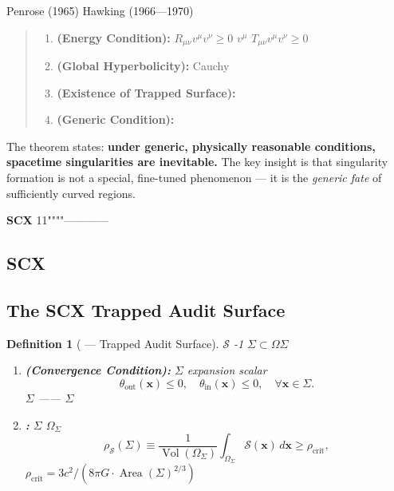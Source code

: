 \documentclass[12pt,a4paper]{article}
\newtheorem{definition}[theorem]{Definition}
\theoremstyle{remark}
\newcommand{\x}{\mathbf{x}}
\DeclareMathOperator{\Vol}{Vol}
\DeclareMathOperator{\Area}{Area}
\newcommand{\cG}{G}          %
\newcommand{\cC}{c}          %
\begin{document}
\noindent
\textbf{} Penrose (1965)  Hawking (1966—1970) 

\begin{quote}
\textit{}
\begin{enumerate}[label=(\arabic*)]
    \item \textbf{ (Energy Condition):} $R_{\mu\nu} v^\mu v^\nu \geq 0$  $v^\mu$ $T_{\mu\nu} v^\mu v^\nu \geq 0$
    \item \textbf{ (Global Hyperbolicity):} Cauchy
    \item \textbf{ (Existence of Trapped Surface):} 
    \item \textbf{ (Generic Condition):} 
\end{enumerate}
\end{quote}

The theorem states: \textbf{under generic, physically reasonable conditions, spacetime singularities are inevitable.} The key insight is that singularity formation is not a special, fine-tuned phenomenon — it is the \textit{generic fate} of sufficiently curved regions.

\vspace{6pt}
\noindent
\textbf{SCX} 11""""————

\subsection{SCX}
\subsection{The SCX Trapped Audit Surface}

\begin{definition}[ — Trapped Audit Surface]\label{def:trapped_audit}
 $\mathcal{S}$ -1 $\Sigma \subset \Omega$$\Sigma$ \textbf{}
\begin{enumerate}[label=(\roman*)]
    \item \textbf{ (Convergence Condition):} $\Sigma$ expansion scalar
    \begin{equation}
        \theta_{\mathrm{out}}(\x) \leq 0, \quad \theta_{\mathrm{in}}(\x) \leq 0, \quad \forall \x \in \Sigma.
    \end{equation}
     $\Sigma$ \textbf{}—— $\Sigma$ 
    
    \item \textbf{:} $\Sigma$  $\Omega_{\Sigma}$ 
    \begin{equation}
        \rho_{\mathcal{S}}(\Sigma) \equiv \frac{1}{\Vol(\Omega_{\Sigma})} \int_{\Omega_{\Sigma}} \mathcal{S}(\x)\, d\x \geq \rho_{\mathrm{crit}},
    \end{equation}
     $\rho_{\mathrm{crit}} = 3\cC^2/(8\pi\cG\cdot \Area(\Sigma)^{2/3})$ 
\end{enumerate}
\end{definition}
\end{document}
